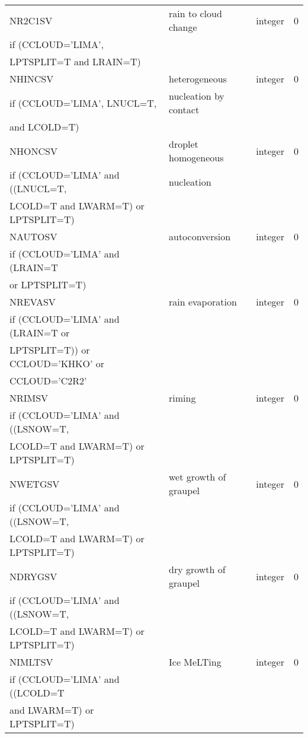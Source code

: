\begin{longtable} {|p{}|p{}|>{\centering}p{}|p{}<{\centering}|}
NR2C1SV & rain to cloud change& integer & 0 \\ \nopagebreak
if (CCLOUD='LIMA', &&&\\ \nopagebreak
LPTSPLIT=T and LRAIN=T)&&& \\\hline

NHINCSV & heterogeneous  & integer & 0 \\ \nopagebreak
if (CCLOUD='LIMA', LNUCL=T,&nucleation by contact&&\\ \nopagebreak
and LCOLD=T)&&& \\\hline

NHONCSV & droplet homogeneous  & integer & 0 \\ \nopagebreak
if (CCLOUD='LIMA' and ((LNUCL=T,& nucleation &&\\ \nopagebreak
LCOLD=T and LWARM=T) or LPTSPLIT=T)&&& \\\hline

NAUTOSV & autoconversion & integer & 0 \\ \nopagebreak
if (CCLOUD='LIMA' and (LRAIN=T&&&\\ \nopagebreak
or LPTSPLIT=T)&&& \\\hline

NREVASV & rain evaporation & integer & 0 \\ \nopagebreak
if (CCLOUD='LIMA' and (LRAIN=T or &&& \\ \nopagebreak
LPTSPLIT=T)) or CCLOUD='KHKO'  or &&& \\ \nopagebreak
CCLOUD='C2R2' &&& \\\hline

NRIMSV & riming & integer & 0 \\  \nopagebreak
if (CCLOUD='LIMA' and ((LSNOW=T,&&&\\  \nopagebreak
LCOLD=T and LWARM=T) or LPTSPLIT=T)&&& \\\hline

NWETGSV & wet growth of graupel & integer & 0 \\ \nopagebreak
if (CCLOUD='LIMA' and ((LSNOW=T,&&&\\  \nopagebreak
LCOLD=T and LWARM=T) or LPTSPLIT=T)&&& \\\hline

NDRYGSV & dry growth of graupel & integer & 0 \\  \nopagebreak
if (CCLOUD='LIMA' and ((LSNOW=T,&&&\\  \nopagebreak
LCOLD=T and LWARM=T) or LPTSPLIT=T)&&& \\\hline

NIMLTSV & Ice MeLTing & integer & 0 \\ \nopagebreak
if (CCLOUD='LIMA' and ((LCOLD=T&&&\\ \nopagebreak
and LWARM=T) or LPTSPLIT=T)&&& \\\hline


\end{longtable}
